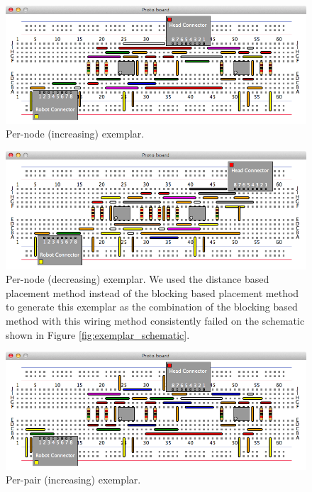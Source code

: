 \begin{figure}[H]
\begin{center}
\includegraphics[width=\textwidth]{Images/exemplar_per_node_increasing.png}
\caption{Per-node (increasing) exemplar.}
\end{center}
\end{figure}

\begin{figure}[H]
\begin{center}
\includegraphics[width=\textwidth]{Images/exemplar_per_node_decreasing.png}
\caption{Per-node (decreasing) exemplar.
We used the distance based placement method instead of the blocking based
placement method to generate this exemplar as the
combination of the blocking based method with this wiring method consistently
failed on the schematic shown in Figure \ref{fig:exemplar_schematic}.}
\end{center}
\end{figure}

\begin{figure}[H]
\begin{center}
\includegraphics[width=\textwidth]{Images/exemplar_per_pair_increasing.png}
\caption{Per-pair (increasing) exemplar.}
\end{center}
\end{figure}


